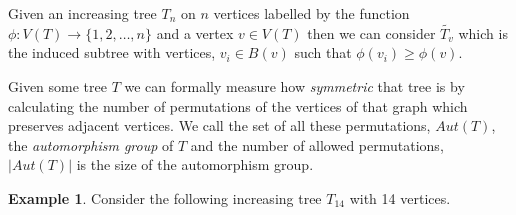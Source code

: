 \documentclass[12pt]{article} %
\theoremstyle{definition}
\newtheorem{ex}[thm]{Example}
\begin{document}
Given an increasing tree $T_{n}$ on $n$ vertices labelled by the function 
$\phi : V(T) \rightarrow \{1,2,\dots,n\}$ and a vertex $v \in V(T)$ then we can consider 
$\tilde{T_{v}}$  which is the induced subtree with vertices, $v_{i}\in B(v)$ such that 
$\phi(v_{i}) \geq \phi(v)$. 

Given some tree $T$ we can formally measure how \emph{symmetric} that tree is by calculating 
the number of permutations of the vertices of that graph which preserves adjacent vertices.  
We call the set of all these permutations, $Aut(T)$, the \emph{automorphism group} of $T$ and 
the number of allowed permutations, $|Aut(T)|$ is the size of the automorphism group.  

\begin{ex}
Consider the following increasing tree $T_{14}$ with 14 vertices.  
\begin{figure}[H]
\centering
\begin{tikzpicture}
  [scale=0.8,auto=left,every node/.style={circle,fill=sotonblue!20}]


\end{tikzpicture}
\end{figure}
\end{ex}
\end{document}
